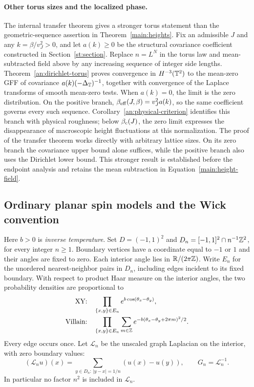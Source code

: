 \paragraph{Other torus sizes and the localized phase.}
The internal transfer theorem gives a stronger torus statement than
the geometric-sequence assertion in Theorem~\ref{main:heights}.
Fix an admissible $J$ and any $k=\beta/v_J^2>0$, and let $a(k)\ge0$ be
the structural covariance coefficient constructed in
Section~\ref{st:section}.  Replace $n=L^N$ in the torus law and
mean-subtracted field above by any increasing sequence of integer
side lengths.  Theorem~\ref{an:dirichlet-torus} proves convergence in
$H^{-3}(\mathbb T^2)$ to the mean-zero GFF of covariance
$a(k)(-\Delta_{\mathbb T})^{-1}$, together with convergence of the Laplace
transforms of smooth mean-zero tests.  When $a(k)=0$, the limit is
the zero distribution.  On the positive branch,
$\beta_{\mathrm{eff}}(J,\beta)=v_J^2a(k)$, so the same coefficient governs every
such sequence.  Corollary~\ref{an:physical-criterion} identifies this
branch with physical roughness; below $\beta_{\mathrm c}(J)$, the zero limit
expresses the disappearance of macroscopic height fluctuations at
this normalization.  The proof of the transfer theorem works directly
with arbitrary lattice sizes.  On its zero branch the covariance
upper bound alone suffices, while the positive branch also uses the
Dirichlet lower bound.  This stronger result is established before
the endpoint analysis and retains the mean subtraction in
Equation~\eqref{main:height-field}.

\subsection{Ordinary planar spin models and the Wick convention}
\label{main:spin-models}

Here $b>0$ is \emph{inverse temperature}.  Set $D=(-1,1)^2$ and
$D_n=[-1,1]^2\cap n^{-1}\mathbb Z^2$, for every integer $n\ge1$.
Boundary vertices have a coordinate equal to $-1$ or $1$ and their
angles are fixed to zero.  Each interior angle lies in
$\mathbb R/(2\pi\mathbb Z)$.  Write $E_n$ for the unordered nearest-neighbor pairs
in $D_n$, including edges incident to its fixed boundary.
With respect to product Haar measure on the interior angles, the
two probability densities are proportional to
\begin{align}
 \text{XY:}\quad &\prod_{\{x,y\}\in E_n}e^{b\cos(\theta_x-\theta_y)},
       \label{main:xy-law}\\
 \text{Villain:}\quad &\prod_{\{x,y\}\in E_n}
       \sum_{m\in\mathbb Z}e^{-b(\theta_x-\theta_y+2\pi m)^2/2}.
       \label{main:villain-law}
\end{align}
Every edge occurs once.  Let $\mathcal L_n$ be the unscaled graph
Laplacian on the interior, with zero boundary values:
\begin{equation}\label{main:spin-green}
 (\mathcal L_nu)(x)=\sum_{y\in D_n:\,|y-x|=1/n}(u(x)-u(y)),
 \qquad G_n=\mathcal L_n^{-1}.
\end{equation}
In particular no factor $n^2$ is included in $\mathcal L_n$.

